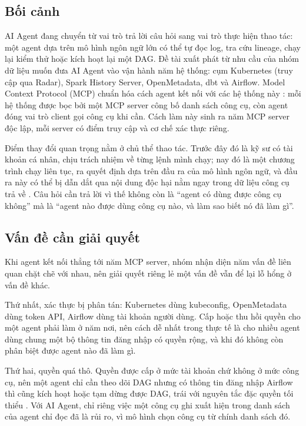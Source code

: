 
\subsection{Bối cảnh}

AI Agent đang chuyển từ vai trò trả lời câu hỏi sang vai trò thực hiện thao tác: một agent dựa trên mô hình ngôn ngữ lớn có thể tự đọc log, tra cứu lineage, chạy lại kiểm thử hoặc kích hoạt lại một DAG. Đề tài xuất phát từ nhu cầu của nhóm dữ liệu muốn đưa AI Agent vào vận hành năm hệ thống: cụm Kubernetes (truy cập qua Radar), Spark History Server, OpenMetadata, dbt và Airflow. Model Context Protocol (MCP) chuẩn hóa cách agent kết nối với các hệ thống này \parencite{mcp_spec}: mỗi hệ thống được bọc bởi một MCP server công bố danh sách công cụ, còn agent đóng vai trò client gọi công cụ khi cần. Cách làm này sinh ra năm MCP server độc lập, mỗi server có điểm truy cập và cơ chế xác thực riêng.

Điểm thay đổi quan trọng nằm ở chủ thể thao tác. Trước đây đó là kỹ sư có tài khoản cá nhân, chịu trách nhiệm về từng lệnh mình chạy; nay đó là một chương trình chạy liên tục, ra quyết định dựa trên đầu ra của mô hình ngôn ngữ, và đầu ra này có thể bị dẫn dắt qua nội dung độc hại nằm ngay trong dữ liệu công cụ trả về \parencite{breakingmcp}. Câu hỏi cần trả lời vì thế không còn là ``agent có dùng được công cụ không'' mà là ``agent nào được dùng công cụ nào, và làm sao biết nó đã làm gì''.

\subsection{Vấn đề cần giải quyết}

Khi agent kết nối thẳng tới năm MCP server, nhóm nhận diện năm vấn đề liên quan chặt chẽ với nhau, nên giải quyết riêng lẻ một vấn đề vẫn để lại lỗ hổng ở vấn đề khác.

Thứ nhất, xác thực bị phân tán: Kubernetes dùng kubeconfig, OpenMetadata dùng token API, Airflow dùng tài khoản người dùng. Cấp hoặc thu hồi quyền cho một agent phải làm ở năm nơi, nên cách dễ nhất trong thực tế là cho nhiều agent dùng chung một bộ thông tin đăng nhập có quyền rộng, và khi đó không còn phân biệt được agent nào đã làm gì.

Thứ hai, quyền quá thô. Quyền được cấp ở mức tài khoản chứ không ở mức công cụ, nên một agent chỉ cần theo dõi DAG nhưng có thông tin đăng nhập Airflow thì cũng kích hoạt hoặc tạm dừng được DAG, trái với nguyên tắc đặc quyền tối thiểu \parencite{saltzer1975protection}. Với AI Agent, chỉ riêng việc một công cụ ghi xuất hiện trong danh sách của agent chỉ đọc đã là rủi ro, vì mô hình chọn công cụ từ chính danh sách đó.

